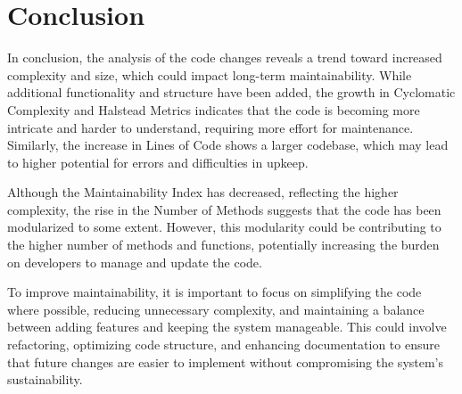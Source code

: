 \section{Conclusion}

In conclusion, the analysis of the code changes reveals a trend toward increased complexity and size, which could impact
long-term maintainability. While additional functionality and structure have been added, the growth in Cyclomatic
Complexity and Halstead Metrics indicates that the code is becoming more intricate and harder to understand, requiring
more effort for maintenance. Similarly, the increase in Lines of Code shows a larger codebase, which may lead to higher
potential for errors and difficulties in upkeep.

Although the Maintainability Index has decreased, reflecting the higher complexity, the rise in the Number of Methods
suggests that the code has been modularized to some extent. However, this modularity could be contributing to the higher
number of methods and functions, potentially increasing the burden on developers to manage and update the code.

To improve maintainability, it is important to focus on simplifying the code where possible, reducing unnecessary
complexity, and maintaining a balance between adding features and keeping the system manageable. This could involve
refactoring, optimizing code structure, and enhancing documentation to ensure that future changes are easier to
implement without compromising the system's sustainability.
